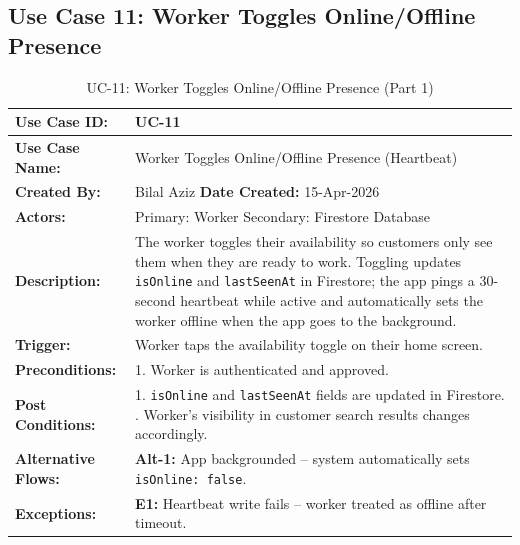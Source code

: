 \newpage

\subsection*{Use Case 11: Worker Toggles Online/Offline Presence}

{\small
\renewcommand{\arraystretch}{1.05}
\begin{table}[H]
\centering
\begin{tabular}{|p{3cm}|p{11.2cm}|}
\hline
\textbf{Use Case ID:} & UC-11 \\ \hline
\textbf{Use Case Name:} & Worker Toggles Online/Offline Presence (Heartbeat) \\ \hline
\textbf{Created By:} & Bilal Aziz \hfill \textbf{Date Created:} 15-Apr-2026 \\ \hline
\textbf{Actors:} & Primary: Worker \quad Secondary: Firestore Database \\ \hline
\textbf{Description:} & The worker toggles their availability so customers only see them when they are ready to work. Toggling updates \texttt{isOnline} and \texttt{lastSeenAt} in Firestore; the app pings a 30-second heartbeat while active and automatically sets the worker offline when the app goes to the background. \\ \hline
\textbf{Trigger:} & Worker taps the availability toggle on their home screen. \\ \hline
\textbf{Preconditions:} & 1. Worker is authenticated and approved. \\ \hline
\textbf{Post Conditions:} & 1. \texttt{isOnline} and \texttt{lastSeenAt} fields are updated in Firestore. \newline 2. Worker's visibility in customer search results changes accordingly. \\ \hline
\textbf{Alternative Flows:} & \textbf{Alt-1:} App backgrounded -- system automatically sets \texttt{isOnline: false}. \\ \hline
\textbf{Exceptions:} & \textbf{E1:} Heartbeat write fails -- worker treated as offline after timeout. \\ \hline
\end{tabular}
\caption*{UC-11: Worker Toggles Online/Offline Presence (Part 1)}
\end{table}
}

\newpage

